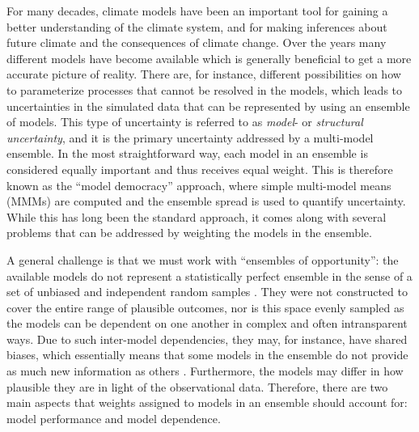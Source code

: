\introduction

For many decades, climate models have been an important tool for gaining a better understanding of the climate system, and for making inferences about future climate and the consequences of climate change. Over the years many different models have become available which is generally beneficial to get a more accurate picture of reality. There are, for instance, different possibilities on how to parameterize processes that cannot be resolved in the models, which leads to uncertainties in the simulated data that can be represented by using an ensemble of models. This type of uncertainty is referred to as \emph{model}- or \emph{structural uncertainty}, and it is the primary uncertainty addressed by a multi-model ensemble.
In the most straightforward way, each model in an ensemble is considered equally important and thus receives equal weight. This is therefore known as the ``model democracy'' approach, where simple multi-model means (MMMs) are computed and the ensemble spread is used to quantify uncertainty. While this has long been the standard approach, it comes along with several problems that can be addressed by weighting the models in the ensemble.

A general challenge is that we must work with ``ensembles of opportunity'': the available models do not represent a statistically perfect ensemble in the sense of a set of unbiased and independent random samples \citep[e.g., see][]{massonClimateModelGenealogy2011, pennellEffectiveNumberClimate2011}. They were not constructed to cover the entire range of plausible outcomes, nor is this space evenly sampled as the models can be dependent on one another in complex and often intransparent ways. Due to such inter-model dependencies, they may, for instance, have shared biases, which essentially means that some models in the ensemble do not provide as much new information as others \citep[e.g., see][]{junSpatialAnalysisQuantify2012}. Furthermore, the models may differ in how plausible they are in light of the observational data. Therefore, there are two main aspects that weights assigned to models in an ensemble should account for: model performance and model dependence.

